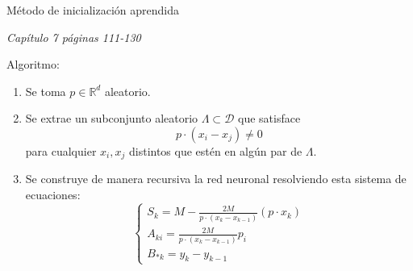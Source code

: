 \documentclass{beamer}
\newcommand{\R}{\mathbb{R}}
\begin{document}
\begin{frame}{Método de inicialización aprendida}
    \begin{flushright}
        \textit{Capítulo 7 páginas 111-130}
    \end{flushright}
    Algoritmo: 
    \begin{enumerate}
        \item Se toma $p \in \R^d$  aleatorio. 
        \item Se extrae un subconjunto aleatorio  $\Lambda \subset \mathcal{D}$
        que satisface 
        \begin{equation*}
            p \cdot (x_i-x_j) \neq 0
        \end{equation*}
        para cualquier $x_i,x_j$ distintos que estén en algún par de $\Lambda$.
        \item Se construye de manera recursiva la red neuronal resolviendo esta sistema de ecuaciones: 
        \begin{equation*}
            \left\{ 
                \begin{array}{l}
                    S_{k} =
                        M -  \frac{2 M}{p \cdot (x_k - x_{k-1})}(p \cdot x_{k})
                    \\
                    A_{k i} = \frac{2 M}{p \cdot (x_k - x_{k-1})}
                    p_{i} 
                    \\
                    B_{* k} = y_k - y_{k-1}
                \end{array}
            \right.
        \end{equation*} 
\end{enumerate}
\end{frame}
\end{document}
